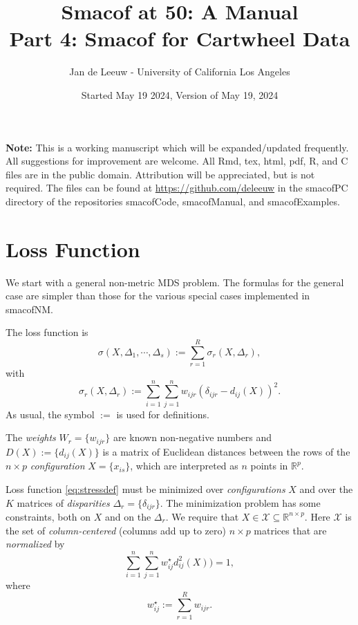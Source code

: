 \documentclass[
  12pt,
]{article}
\title{Smacof at 50: A Manual\\
Part 4: Smacof for Cartwheel Data}
\author{Jan de Leeuw - University of California Los Angeles}
\date{Started May 19 2024, Version of May 19, 2024}
\newcommand{\sectionbreak}{\clearpage}
\begin{document}
\maketitle

{
\setcounter{tocdepth}{3}
\tableofcontents
}
\textbf{Note:} This is a working manuscript which will be expanded/updated
frequently. All suggestions for improvement are welcome. All Rmd, tex,
html, pdf, R, and C files are in the public domain. Attribution will be
appreciated, but is not required. The files can be found at
\url{https://github.com/deleeuw} in the smacofPC directory of the
repositories smacofCode, smacofManual, and smacofExamples.

\sectionbreak

\section{Loss Function}\label{loss-function}

We start with a general non-metric MDS problem. The formulas for the general case are simpler than those for the various special cases implemented
in smacofNM.

The loss function is
\begin{equation}
\sigma(X,\Delta_1,\cdots,\Delta_s):=\sum_{r=1}^R\sigma_r(X,\Delta_r),
\label{eq:stressdef}
\end{equation}
with
\begin{equation}
\sigma_r(X,\Delta_r):=\sum_{i=1}^n\sum_{j=1}^n w_{ijr}(\delta_{ijr}-d_{ij}(X))^2.
\label{eq:rstressdef}
\end{equation}
As usual, the symbol \(:=\) is used for definitions.

The \emph{weights} \(W_r=\{w_{ijr}\}\) are known non-negative
numbers and \(D(X):=\{d_{ij}(X)\}\) is a matrix of Euclidean distances
between the rows of the \(n\times p\) \emph{configuration} \(X=\{x_{is}\}\), which are interpreted as \(n\) points in \(\mathbb{R}^p\).

Loss function \eqref{eq:stressdef} must be minimized over \emph{configurations} \(X\) and over the \(K\) matrices of \emph{disparities} \(\Delta_r=\{\delta_{ijr}\}\). The minimization problem has some constraints, both on \(X\) and on the \(\Delta_r\).
We require that \(X\in\mathcal{X}\subseteq\mathbb{R}^{n\times p}\). Here \(\mathcal{X}\) is the set of \emph{column-centered} (columns add up to zero) \(n\times p\) matrices that are \emph{normalized} by
\begin{equation}
\sum_{i=1}^n\sum_{j=1}^n w_{ij}^\star d_{ij}^2(X))=1,
\label{eq:xscale}
\end{equation}
where
\begin{equation}
w_{ij}^\star:=\sum_{r=1}^R w_{ijr}.
\label{eq:wstardef}
\end{equation}
\end{document}
